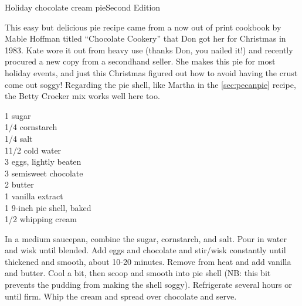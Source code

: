 \begin{entry}{Holiday chocolate cream pie}{Second Edition}

\begin{open}
  This easy but delicious pie recipe came from a now out of print cookbook by
  Mable Hoffman titled ``Chocolate Cookery'' that Don got her for Christmas in
  1983. Kate wore it out from heavy use (thanks Don, you nailed it!) and
  recently procured a new copy from a secondhand seller. She makes this pie
  for most holiday events, and just this Christmas figured out how to avoid
  having the crust come out soggy! Regarding the pie shell, like Martha in the
  \ref{sec:pecanpie} recipe, the Betty Crocker mix works well here too.
\end{open}
\begin{ingredients}
    \SI{1}{\cup} sugar\\
    \SI{1/4}{\cup} cornstarch\\
    \SI{1/4}{\teaspoon} salt\\
    1\SI{1/2}{\cup} cold water\\
    3 eggs, lightly beaten \\
    \SI{3}{\ounce} semisweet chocolate \\
    \SI{2}{\tblspoon} butter \\
    \SI{1}{\teaspoon} vanilla extract\\
    1 9-inch pie shell, baked \\
    \SI{1/2}{\cup} whipping cream
\end{ingredients}
In a medium saucepan, combine the sugar, cornstarch, and salt. Pour in water
and wisk until blended. Add eggs and chocolate and stir/wisk constantly until
thickened and smooth, about 10-20 minutes. Remove from heat and add vanilla
and butter. Cool a bit, then scoop and smooth into pie shell (NB: this bit
prevents the pudding from making the shell soggy). Refrigerate several hours
or until firm. Whip the cream and spread over chocolate and serve.
\end{entry}


